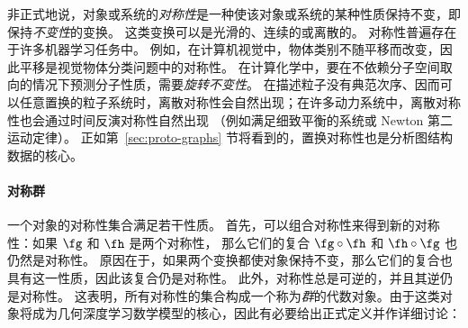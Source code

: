 非正式地说，对象或系统的{\em 对称性}是一种使该对象或系统的某种性质保持不变，即保持{\em 不变性}的变换。
这类变换可以是光滑的、连续的或离散的。
%
对称性普遍存在于许多机器学习任务中。
例如，在计算机视觉中，物体类别不随平移而改变，因此平移是视觉物体分类问题中的对称性。
%
在计算化学中，要在不依赖分子空间取向的情况下预测分子性质，需要{\em{旋转不变性}}。
%
在描述粒子没有典范次序、因而可以任意置换的粒子系统时，离散对称性会自然出现；在许多动力系统中，离散对称性也会通过时间反演对称性自然出现
（例如满足细致平衡的系统或 Newton 第二运动定律）。%
%
正如第~\ref{sec:proto-graphs} 节将看到的，置换对称性也是分析图结构数据的核心。%

\paragraph{对称群}
一个对象的对称性集合满足若干性质。
首先，可以组合对称性来得到新的对称性：如果 $\fg$ 和 $\fh$ 是两个对称性，
那么它们的复合 $\fg \circ \fh$ 和 $\fh \circ \fg$
也仍然是对称性。
原因在于，如果两个变换都使对象保持不变，那么它们的复合也具有这一性质，因此该复合仍是对称性。
此外，对称性总是可逆的，并且其逆仍是对称性。
这表明，所有对称性的集合构成一个称为{\em 群}的代数对象。由于这类对象将成为几何深度学习数学模型的核心，因此有必要给出正式定义并作详细讨论：


